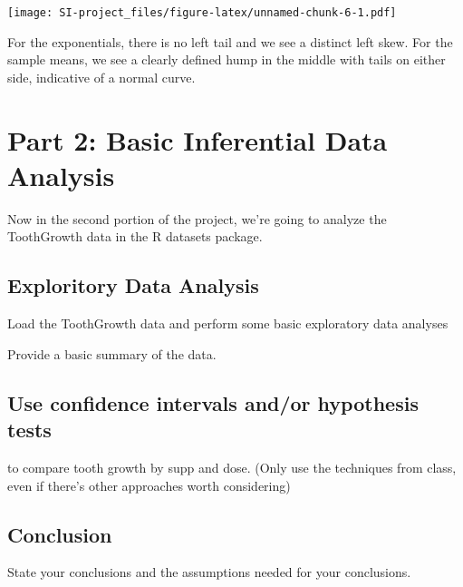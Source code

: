 \documentclass[]{article}
\begin{document}
\texttt{[image: SI-project\_files/figure-latex/unnamed-chunk-6-1.pdf]}

For the exponentials, there is no left tail and we see a distinct left
skew. For the sample means, we see a clearly defined hump in the middle
with tails on either side, indicative of a normal curve.

\section{Part 2: Basic Inferential Data
Analysis}\label{part-2-basic-inferential-data-analysis}

Now in the second portion of the project, we're going to analyze the
ToothGrowth data in the R datasets package.

\subsection{Exploritory Data Analysis}\label{exploritory-data-analysis}

Load the ToothGrowth data and perform some basic exploratory data
analyses

Provide a basic summary of the data.

\subsection{Use confidence intervals and/or hypothesis
tests}\label{use-confidence-intervals-andor-hypothesis-tests}

to compare tooth growth by supp and dose. (Only use the techniques from
class, even if there's other approaches worth considering)

\subsection{Conclusion}\label{conclusion}

State your conclusions and the assumptions needed for your conclusions.
\end{document}
